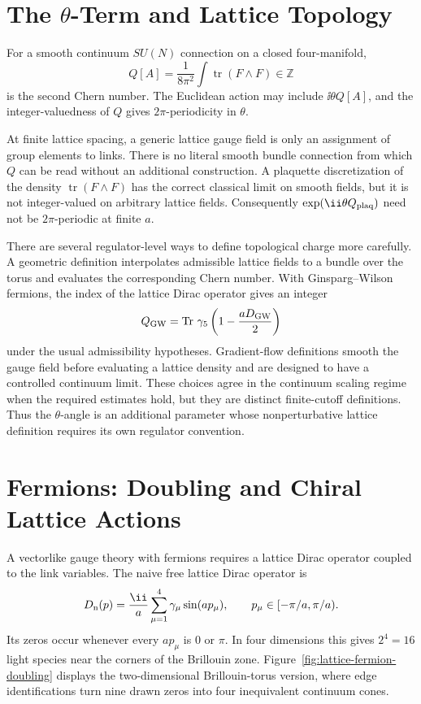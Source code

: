 \section[Theta-Term and Lattice Topology]{The \(\theta\)-Term and Lattice Topology}

For a smooth continuum \(SU(N)\) connection on a closed four-manifold,
\[
  Q[A]
  =
  \frac{1}{8\pi^2}\int \operatorname{tr}(F\wedge F)
  \in\mathbb Z
\]
is the second Chern number.  The Euclidean action may include
\(\ii\theta Q[A]\), and the integer-valuedness of \(Q\) gives
\(2\pi\)-periodicity in \(\theta\).

At finite lattice spacing, a generic lattice gauge field is only an assignment
of group elements to links.  There is no literal smooth bundle connection from
which \(Q\) can be read without an additional construction.  A plaquette
discretization of the density \(\operatorname{tr}(F\wedge F)\) has the correct
classical limit on smooth fields, but it is not integer-valued on arbitrary
lattice fields.  Consequently \(\exp(\ii\theta Q_{\rm plaq})\) need not be
\(2\pi\)-periodic at finite \(a\).

There are several regulator-level ways to define topological charge more
carefully.  A geometric definition interpolates admissible lattice fields to a
bundle over the torus and evaluates the corresponding Chern number.  With
Ginsparg--Wilson fermions, the index of the lattice Dirac operator gives an
integer
\[
  Q_{\rm GW}
  =
  \operatorname{Tr}\,\gamma_5\left(1-\frac{aD_{\rm GW}}{2}\right)
\]
under the usual admissibility hypotheses.  Gradient-flow definitions smooth
the gauge field before evaluating a lattice density and are designed to have a
controlled continuum limit.  These choices agree in the continuum scaling
regime when the required estimates hold, but they are distinct finite-cutoff
definitions.  Thus the \(\theta\)-angle is an additional parameter whose
nonperturbative lattice definition requires its own regulator convention.

\section{Fermions: Doubling and Chiral Lattice Actions}

A vectorlike gauge theory with fermions requires a lattice Dirac operator
coupled to the link variables.  The naive free lattice Dirac operator is
\begin{equation}
  D_{\rm n}(p)
  =
  \frac{\ii}{a}\sum_{\mu=1}^4\gamma_\mu\sin(ap_\mu),
  \qquad
  p_\mu\in[-\pi/a,\pi/a).
  \label{eq:lattice-naive-dirac-symbol}
\end{equation}
Its zeros occur whenever every \(ap_\mu\) is \(0\) or \(\pi\).  In four
dimensions this gives \(2^4=16\) light species near the corners of the
Brillouin zone.  Figure~\ref{fig:lattice-fermion-doubling} displays the
two-dimensional Brillouin-torus version, where edge identifications turn nine
drawn zeros into four inequivalent continuum cones.

